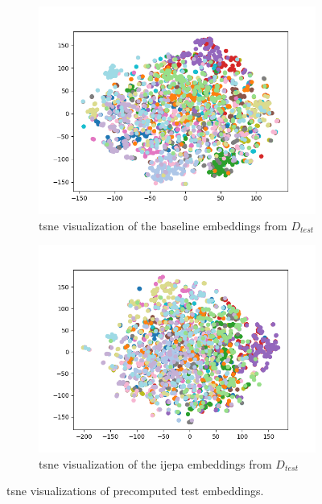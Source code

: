 \begin{multicols}{2}
	\begin{figure}[ht!]
		\begin{subfigure}[t]{.4\linewidth}
			\centering
			\includegraphics[width=1\linewidth]{images/2d_base_test_scatter.png} 
			\caption{\gls{tsne} visualization of the baseline embeddings from $D_{test}$}
		\end{subfigure}
		\hfill
		\begin{subfigure}[t]{.4\linewidth}
			\centering
			\includegraphics[width=1\linewidth]{images/2d_test_scatter.png} 
			\caption{\gls{tsne} visualization of the \gls{ijepa} embeddings from $D_{test}$}
		\end{subfigure}
		\caption{\gls{tsne} visualizations of precomputed test embeddings.}
	\end{figure}
	\label{fig:tsne_embeddings_test}
\end{multicols}

